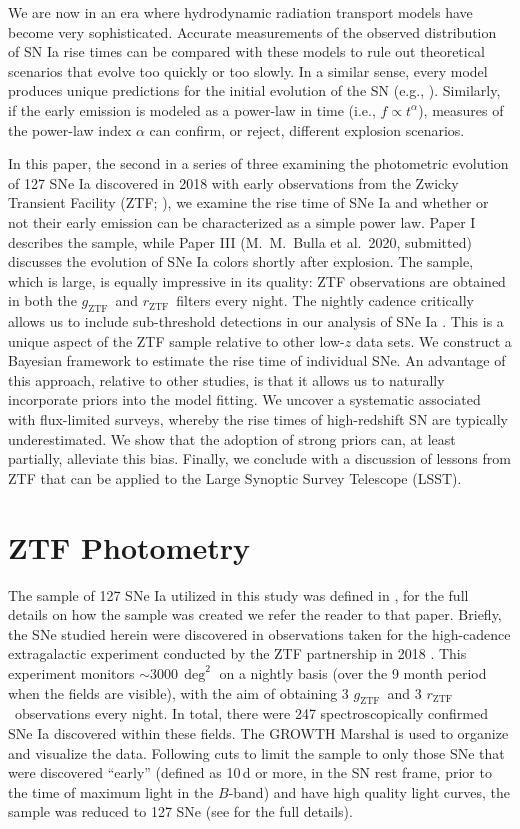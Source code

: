 \documentclass[twocolumn]{./aastex63}
\newcommand{\rztf}{$r_\mathrm{ZTF}$}
\newcommand{\gztf}{$g_\mathrm{ZTF}$}
\begin{document}
We are now in an era where hydrodynamic radiation transport models have become
very sophisticated. Accurate measurements of the observed distribution of SN Ia
rise times can be compared with these models to rule out theoretical scenarios
that evolve too quickly or too slowly. In a similar sense, every model produces
unique predictions for the initial evolution of the SN (e.g.,
\citealt{Noebauer17}). Similarly, if the early emission is modeled as a
power-law in time (i.e., $f \propto t^\alpha$), measures of the power-law index
$\alpha$ can confirm, or reject, different explosion scenarios.

In this paper, the second in a series of three examining the photometric
evolution of 127 SNe Ia discovered in 2018 with early observations from the
Zwicky Transient Facility (ZTF; \citealt{Bellm19,Graham19}), we examine the rise
time of SNe Ia and whether or not their early emission can be characterized as a
simple power law. Paper I \citep{Yao19} describes the sample, while Paper III
(M.\ M.~Bulla et al.\ 2020, submitted) discusses the evolution of SNe Ia colors
shortly after explosion. The sample, which is large, is equally impressive in
its quality: ZTF observations are obtained in both the \gztf\ and \rztf\ filters
every night. The nightly cadence critically allows us to include sub-threshold
detections in our analysis of SNe Ia \citep{Yao19}. This is a unique aspect of
the ZTF sample relative to other low-$z$ data sets. We construct a Bayesian
framework to estimate the rise time of individual SNe. An advantage of this
approach, relative to other studies, is that it allows us to naturally
incorporate priors into the model fitting. We uncover a systematic associated
with flux-limited surveys, whereby the rise times of high-redshift SN are
typically underestimated. We show that the adoption of strong priors can, at
least partially, alleviate this bias. Finally, we conclude with a discussion of
lessons from ZTF that can be applied to the Large Synoptic Survey Telescope
(LSST).

\section{ZTF Photometry}

The sample of 127 SNe Ia utilized in this study was defined in \citet{Yao19},
for the full details on how the sample was created we refer the reader to that
paper. Briefly, the SNe studied herein were discovered in observations taken for
the high-cadence extragalactic experiment conducted by the ZTF partnership in
2018 \citep{Bellm19a}. This experiment monitors $\sim$3000\,$\deg^2$ on a
nightly basis (over the 9 month period when the fields are visible), with the
aim of obtaining 3 \gztf\ and 3 \rztf\ observations every night. In total, there
were 247 spectroscopically confirmed SNe Ia discovered within these fields. The
GROWTH Marshal \citep{Kasliwal19} is used to organize and visualize the data.
Following cuts to limit the sample to only those SNe that were discovered
``early'' (defined as 10\,d or more, in the SN rest frame, prior to the time of
maximum light in the $B$-band) and have high quality light curves, the sample
was reduced to 127 SNe (see \citealt{Yao19} for the full details).
\end{document}
